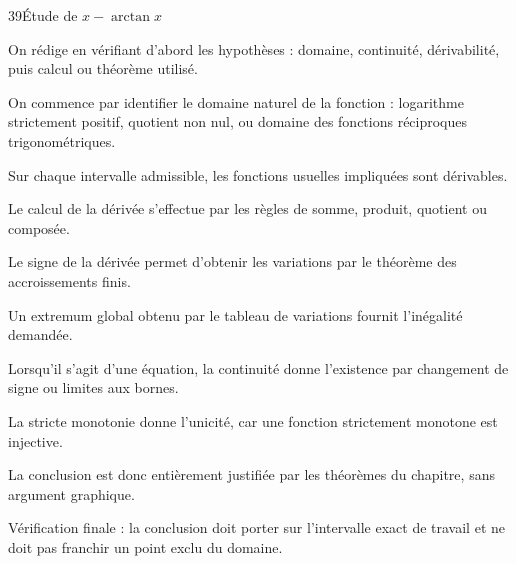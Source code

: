 \documentclass[11pt,a4paper]{article}
\begin{document}
\begin{corrbox}{39}{Étude de $x-\arctan x$}

\begin{methodebox}
On rédige en vérifiant d'abord les hypothèses : domaine, continuité, dérivabilité, puis calcul ou théorème utilisé.
\end{methodebox}

On commence par identifier le domaine naturel de la fonction : logarithme strictement positif, quotient non nul, ou domaine des fonctions réciproques trigonométriques.


Sur chaque intervalle admissible, les fonctions usuelles impliquées sont dérivables.


Le calcul de la dérivée s'effectue par les règles de somme, produit, quotient ou composée.


Le signe de la dérivée permet d'obtenir les variations par le théorème des accroissements finis.


Un extremum global obtenu par le tableau de variations fournit l'inégalité demandée.


Lorsqu'il s'agit d'une équation, la continuité donne l'existence par changement de signe ou limites aux bornes.


La stricte monotonie donne l'unicité, car une fonction strictement monotone est injective.


La conclusion est donc entièrement justifiée par les théorèmes du chapitre, sans argument graphique.


\begin{attentionbox}
Vérification finale : la conclusion doit porter sur l'intervalle exact de travail et ne doit pas franchir un point exclu du domaine.
\end{attentionbox}

\end{corrbox}
\end{document}
